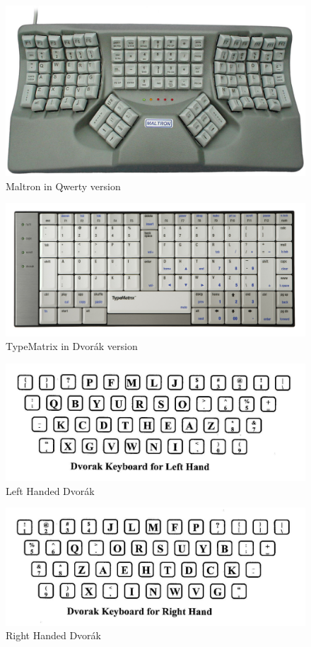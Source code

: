 \documentclass[MTech]{iitmdiss}
\begin{document}
\begin{figure}[h!]
	\centering
	\includegraphics[scale=3.4]{Images/maltron}
	\caption{Maltron in Qwerty version}
\end{figure}

\begin{figure}[h!]
	\centering
	\includegraphics[scale=0.16]{Images/typematrix}
	\caption{TypeMatrix in Dvorák version}
\end{figure}

\begin{figure}[h!]
	\centering
	\includegraphics[scale=0.35]{Images/dvorak_left_hand}
	\caption{Left Handed Dvorák}
\end{figure}

\begin{figure}[h!]
	\centering
	\includegraphics[scale=0.35]{Images/dvorak_right_hand}
	\caption{Right Handed Dvorák}
\end{figure}
\end{document}
